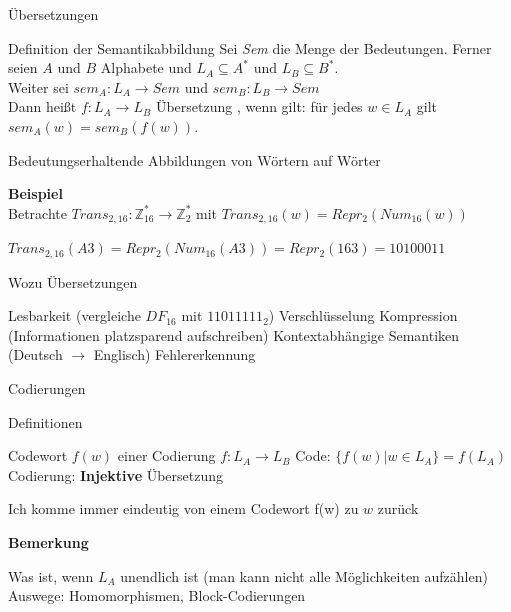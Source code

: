 \documentclass[handout]{beamer}
\begin{document}
\begin{frame} {Übersetzungen}
\begin{block} {Definition der Semantikabbildung}
Sei \textit{Sem} die Menge der Bedeutungen. \p Ferner seien $A$ und $B$ Alphabete \p und $L_A \subseteq A^* \text{ und } L_B \subseteq B^*$.\\
\p Weiter sei $sem_A:L_A \rightarrow Sem$ \p und $sem_B: L_B \rightarrow Sem$\\
\p Dann heißt $f: L_A \rightarrow L_B$ Übersetzung \p , wenn gilt: für jedes $w \in L_A$ gilt $sem_A(w) = sem_B(f(w))$.
\end{block}
\begin{itemize}
\pitem Bedeutungserhaltende Abbildungen von Wörtern auf Wörter
\end{itemize}
\textbf{Beispiel}\\
\p Betrachte $Trans_{2,16}: \mathbb{Z}_{16}^* \rightarrow \mathbb{Z}_{2}^*$ mit $ Trans_{2,16}(w) = Repr_2(Num_{16}(w))$
\begin{itemize}
\pitem $Trans_{2,16}(A3) = Repr_2(Num_{16}(A3)) = Repr_2(163) = 10100011$
\end{itemize}
\end{frame}
\begin{frame}{Wozu Übersetzungen}
\begin{itemize}
\pitem Lesbarkeit (vergleiche $DF_{16}$ mit $11011111_2$)
\pitem Verschlüsselung
\pitem Kompression (Informationen platzsparend aufschreiben)
\pitem Kontextabhängige Semantiken (Deutsch $\rightarrow$ Englisch)
\pitem Fehlererkennung
\end{itemize} 
\end{frame}


\begin{frame}{Codierungen}	
\begin{block}{Definitionen}
\begin{itemize}
\pitem Codewort $f(w)$ \p einer Codierung $f: L_A \rightarrow L_B$
\pitem Code: $\{f(w)|w \in L_A\} = f(L_A)$
\pitem Codierung: \textbf{Injektive} Übersetzung
\begin{itemize}
\pitem Ich komme immer eindeutig von einem Codewort f(w) zu $w$ zurück
\end{itemize}
\end{itemize}
\end{block}\p
\textbf{Bemerkung}\\
\begin{itemize}
\pitem Was ist, wenn $L_A$ unendlich ist (man kann nicht alle Möglichkeiten aufzählen)
\pitem Auswege: Homomorphismen, Block-Codierungen
\end{itemize}
\end{frame}
\end{document}
